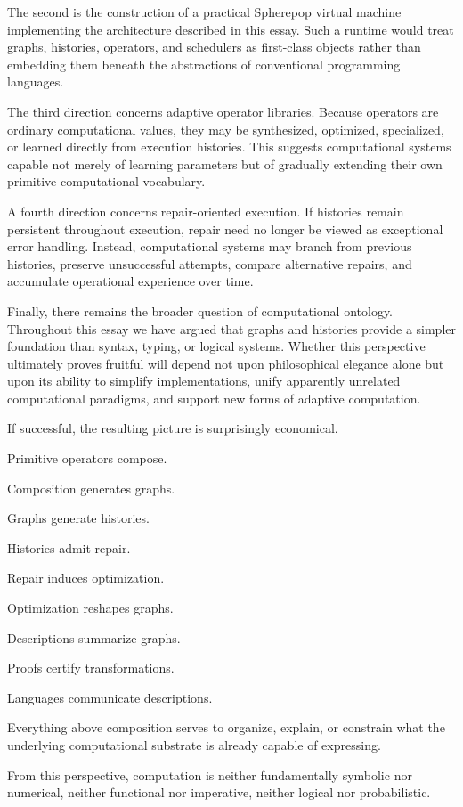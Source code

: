 \documentclass[12pt,oneside]{article}
\begin{document}
The second is the construction of a practical Spherepop virtual machine implementing the architecture described in this essay. Such a runtime would treat graphs, histories, operators, and schedulers as first-class objects rather than embedding them beneath the abstractions of conventional programming languages.

The third direction concerns adaptive operator libraries. Because operators are ordinary computational values, they may be synthesized, optimized, specialized, or learned directly from execution histories. This suggests computational systems capable not merely of learning parameters but of gradually extending their own primitive computational vocabulary.

A fourth direction concerns repair-oriented execution. If histories remain persistent throughout execution, repair need no longer be viewed as exceptional error handling. Instead, computational systems may branch from previous histories, preserve unsuccessful attempts, compare alternative repairs, and accumulate operational experience over time.

Finally, there remains the broader question of computational ontology. Throughout this essay we have argued that graphs and histories provide a simpler foundation than syntax, typing, or logical systems. Whether this perspective ultimately proves fruitful will depend not upon philosophical elegance alone but upon its ability to simplify implementations, unify apparently unrelated computational paradigms, and support new forms of adaptive computation.

If successful, the resulting picture is surprisingly economical.

Primitive operators compose.

Composition generates graphs.

Graphs generate histories.

Histories admit repair.

Repair induces optimization.

Optimization reshapes graphs.

Descriptions summarize graphs.

Proofs certify transformations.

Languages communicate descriptions.

Everything above composition serves to organize, explain, or constrain what the underlying computational substrate is already capable of expressing.

From this perspective, computation is neither fundamentally symbolic nor numerical, neither functional nor imperative, neither logical nor probabilistic.
\end{document}
